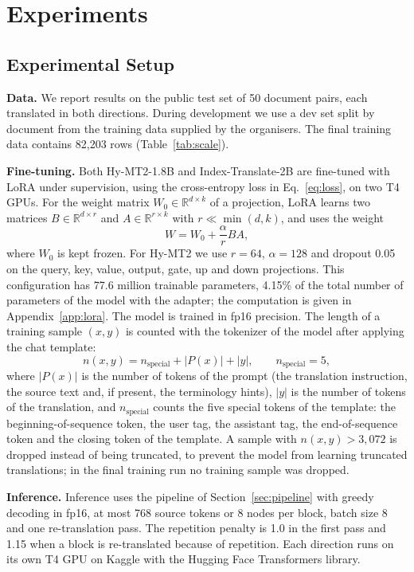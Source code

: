 \documentclass[conference]{IEEEtran}
\begin{document}
\section{Experiments}\label{sec:experiments}
\subsection{Experimental Setup}
\textbf{Data.} We report results on the public test set of 50 document pairs, each translated in both directions. During development we use a dev set split by document from the training data supplied by the organisers. The final training data contains 82,203 rows (Table~\ref{tab:scale}).

\textbf{Fine-tuning.} Both Hy-MT2-1.8B and Index-Translate-2B are fine-tuned with LoRA under supervision, using the cross-entropy loss in Eq.~\eqref{eq:loss}, on two T4 GPUs. For the weight matrix $W_0 \in \mathbb{R}^{d \times k}$ of a projection, LoRA learns two matrices $B \in \mathbb{R}^{d \times r}$ and $A \in \mathbb{R}^{r \times k}$ with $r \ll \min(d, k)$, and uses the weight
\begin{equation}
W = W_0 + \frac{\alpha}{r} B A,
\label{eq:lora}
\end{equation}
where $W_0$ is kept frozen. For Hy-MT2 we use $r = 64$, $\alpha = 128$ and dropout 0.05 on the query, key, value, output, gate, up and down projections. This configuration has 77.6 million trainable parameters, 4.15\% of the total number of parameters of the model with the adapter; the computation is given in Appendix~\ref{app:lora}. The model is trained in fp16 precision. The length of a training sample $(x,y)$ is counted with the tokenizer of the model after applying the chat template:
\begin{equation}
n(x, y) = n_{\mathrm{special}} + |P(x)| + |y|, \qquad n_{\mathrm{special}} = 5,
\label{eq:len}
\end{equation}
where $|P(x)|$ is the number of tokens of the prompt (the translation instruction, the source text and, if present, the terminology hints), $|y|$ is the number of tokens of the translation, and $n_{\mathrm{special}}$ counts the five special tokens of the template: the beginning-of-sequence token, the user tag, the assistant tag, the end-of-sequence token and the closing token of the template. A sample with $n(x,y)>3{,}072$ is dropped instead of being truncated, to prevent the model from learning truncated translations; in the final training run no training sample was dropped.

\textbf{Inference.} Inference uses the pipeline of Section~\ref{sec:pipeline} with greedy decoding in fp16, at most 768 source tokens or 8 nodes per block, batch size 8 and one re-translation pass. The repetition penalty is 1.0 in the first pass and 1.15 when a block is re-translated because of repetition. Each direction runs on its own T4 GPU on Kaggle with the Hugging Face Transformers library.
\end{document}
